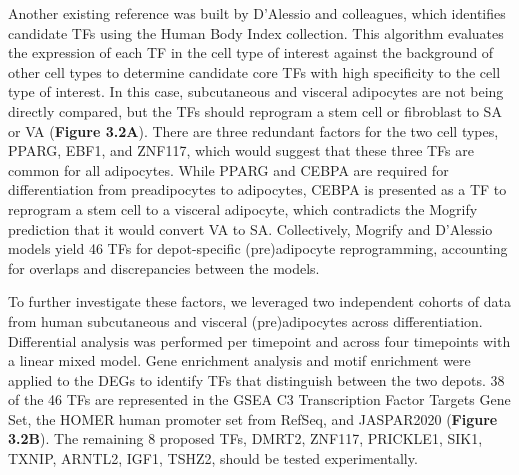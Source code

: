 Another existing reference was built by D'Alessio and colleagues, which identifies candidate TFs using the Human Body Index collection\cite{D-Alessio2015-ia}. This algorithm evaluates the expression of each TF in the cell type of interest against the background of other cell types to determine candidate core TFs with high specificity to the cell type of interest. In this case, subcutaneous and visceral adipocytes are not being directly compared, but the TFs should reprogram a stem cell or fibroblast to SA or VA (\textbf{Figure 3.2A}). There are three redundant factors for the two cell types, PPARG, EBF1, and ZNF117, which would suggest that these three TFs are common for all adipocytes. While PPARG and CEBPA are required for differentiation from preadipocytes to adipocytes\cite{Lefterova2008-rk}, CEBPA is presented as a TF to reprogram a stem cell to a visceral adipocyte, which contradicts the Mogrify prediction that it would convert VA to SA. Collectively, Mogrify and D'Alessio models yield 46 TFs for depot-specific (pre)adipocyte reprogramming, accounting for overlaps and discrepancies between the models.

To further investigate these factors, we leveraged two independent cohorts of data from human subcutaneous and visceral (pre)adipocytes across differentiation\cite{Laber2023-qe,Bradford2019-ps}. Differential analysis was performed per timepoint and across four timepoints with a linear mixed model. Gene enrichment analysis and motif enrichment were applied to the DEGs to identify TFs that distinguish between the two depots. 38 of the 46 TFs are represented in the GSEA C3 Transcription Factor Targets Gene Set\cite{Liberzon2015-uo}, the HOMER human promoter set from RefSeq\cite{Heinz2010-lw}, and JASPAR2020\cite{Fornes2020-uo} (\textbf{Figure 3.2B}). The remaining 8 proposed TFs, DMRT2, ZNF117, PRICKLE1, SIK1, TXNIP, ARNTL2, IGF1, TSHZ2, should be tested experimentally.

